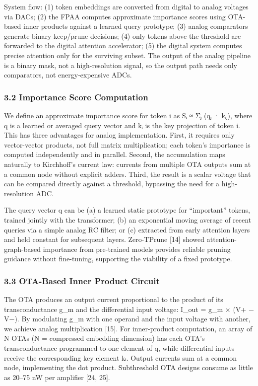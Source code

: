 System flow: (1) token embeddings are converted from digital to analog
voltages via DACs; (2) the FPAA computes approximate importance scores
using OTA-based inner products against a learned query prototype; (3)
analog comparators generate binary keep/prune decisions; (4) only tokens
above the threshold are forwarded to the digital attention accelerator;
(5) the digital system computes precise attention only for the surviving
subset. The output of the analog pipeline is a binary mask, not a
high-resolution signal, so the output path needs only comparators, not
energy-expensive ADCs.

\subsubsection{3.2 Importance Score
Computation}\label{importance-score-computation}

We define an approximate importance score for token i as Sᵢ ≈ Σⱼ (qⱼ ·
kᵢⱼ), where q is a learned or averaged query vector and kᵢ is the key
projection of token i. This has three advantages for analog
implementation. First, it requires only vector-vector products, not full
matrix multiplication; each token's importance is computed independently
and in parallel. Second, the accumulation maps naturally to Kirchhoff's
current law: currents from multiple OTA outputs sum at a common node
without explicit adders. Third, the result is a scalar voltage that can
be compared directly against a threshold, bypassing the need for a
high-resolution ADC.

The query vector q can be (a) a learned static prototype for
``important'' tokens, trained jointly with the transformer; (b) an
exponential moving average of recent queries via a simple analog RC
filter; or (c) extracted from early attention layers and held constant
for subsequent layers. Zero-TPrune {[}14{]} showed attention-graph-based
importance from pre-trained models provides reliable pruning guidance
without fine-tuning, supporting the viability of a fixed prototype.

\subsubsection{3.3 OTA-Based Inner Product
Circuit}\label{ota-based-inner-product-circuit}

The OTA produces an output current proportional to the product of its
transconductance g\_m and the differential input voltage: I\_out = g\_m
× (V+ − V−). By modulating g\_m with one operand and the input voltage
with another, we achieve analog multiplication {[}15{]}. For
inner-product computation, an array of N OTAs (N = compressed embedding
dimension) has each OTA's transconductance programmed to one element of
q, while differential inputs receive the corresponding key element kᵢ.
Output currents sum at a common node, implementing the dot product.
Subthreshold OTA designs consume as little as 20--75 nW per amplifier
{[}24, 25{]}.


